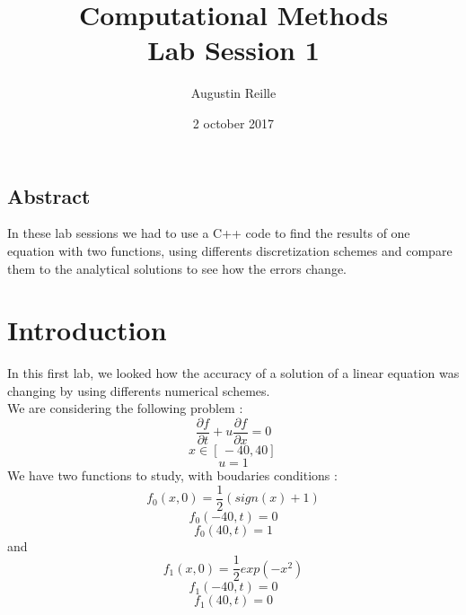 \documentclass{report}
\title{Computational Methods \\ Lab Session 1}
\author{Augustin Reille}
\date{2 october 2017}
\begin{document}
        \maketitle
        \tableofcontents

            \section*{Abstract}
                In these lab sessions we had to use a C++ code to find the results of one 
                equation with two functions, using differents discretization schemes and compare them to the analytical solutions to see how the errors
                change. 
            \chapter{Introduction}
                In this first lab, we looked how the accuracy of a solution 
                of a linear equation was changing by using differents numerical
                schemes. \\
                We are considering the following problem : 
                \vspace{2mm}
                \[
                    \frac{\partial f}{\partial t}
                    + u \frac{\partial f}{\partial x} = 0
                \]
                \vspace{2mm}
                \[
                    x \in [\,-40, 40]\,
                \]
                \vspace{2mm}
                \[
                    u = 1    
                \]
                We have two functions to study, with boudaries conditions :
                \vspace{2mm}
                \[
                    f_{0} (x, 0) = 
                    \frac{1}{2} (sign(x) + 1)
                \]
                \vspace{2mm}
                \[
                    f_{0} (-40, t) = 0
                \]
                \vspace{2mm}
                \[
                    f_{0} (40, t) = 1
                \]
                and
                \vspace{2mm}
                \[
                    f_{1} (x, 0) = 
                    \frac{1}{2} exp(-x^{2})
                \]
                \vspace{2mm}
                \[
                    f_{1} (-40, t) = 0
                \]
                \vspace{2mm}
                \[
                    f_{1} (40, t) = 0
                \]
\end{document}
